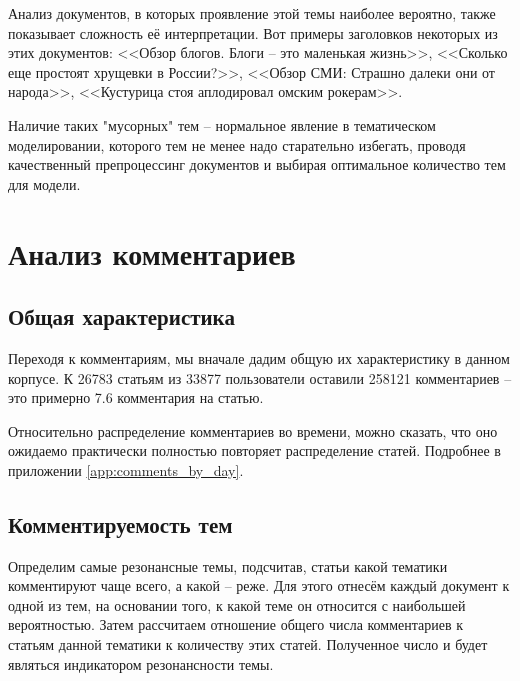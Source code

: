 Анализ документов, в которых проявление этой темы наиболее вероятно, также показывает сложность её интерпретации. Вот примеры заголовков некоторых из этих документов: <<Обзор блогов. Блоги – это маленькая жизнь>>, <<Сколько еще простоят хрущевки в России?>>, <<Обзор СМИ: Страшно далеки они от народа>>, <<Кустурица стоя аплодировал омским рокерам>>.

Наличие таких "мусорных" тем -- нормальное явление в тематическом моделировании, которого тем не менее надо старательно избегать, проводя качественный препроцессинг документов и выбирая оптимальное количество тем для модели.

\section{Анализ комментариев}
\subsection{Общая характеристика}
Переходя к комментариям, мы вначале дадим общую их характеристику в данном корпусе. К 26783 статьям  из 33877 пользователи оставили 258121 комментариев -- это примерно 7.6 комментария на статью.

Относительно распределение комментариев во времени, можно сказать, что оно ожидаемо практически полностью повторяет распределение статей. Подробнее в приложении \ref{app:comments_by_day}.

\subsection{Комментируемость тем}
Определим самые резонансные темы, подсчитав, статьи какой тематики комментируют чаще всего, а какой -- реже. Для этого отнесём каждый документ к одной из тем, на основании  того, к какой теме он относится с наибольшей вероятностью. Затем рассчитаем отношение общего числа комментариев к статьям данной тематики к количеству этих статей. Полученное число и будет являться индикатором резонансности темы.

